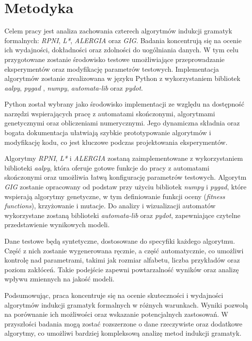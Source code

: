 \chapter{Metodyka}  
\label{cha:metodyka}  

Celem pracy jest analiza zachowania czterech algorytmów indukcji gramatyk formalnych: \textit{RPNI}, \textit{L*}, \textit{ALERGIA} oraz \textit{GIG}. Badania koncentrują się na ocenie ich wydajności, dokładności oraz zdolności do uogólniania danych. W tym celu przygotowane zostanie środowisko testowe umożliwiające przeprowadzanie eksperymentów oraz modyfikację parametrów testowych. Implementacja algorytmów zostanie zrealizowana w języku Python z wykorzystaniem bibliotek \textit{aalpy}, \textit{pygad} \cite{Gad2024}, \textit{numpy}, \textit{automata-lib} oraz \textit{pydot}.  

Python został wybrany jako środowisko implementacji ze względu na dostępność narzędzi wspierających pracę z automatami skończonymi, algorytmami genetycznymi oraz obliczeniami numerycznymi. Jego dynamiczna składnia oraz bogata dokumentacja ułatwiają szybkie prototypowanie algorytmów i modyfikację kodu, co jest kluczowe podczas projektowania eksperymentów.  

Algorytmy \textit{RPNI}, \textit{L*} i \textit{ALERGIA} zostaną zaimplementowane z wykorzystaniem biblioteki \textit{aalpy}, która oferuje gotowe funkcje do pracy z automatami skończonymi oraz umożliwia łatwą konfigurację parametrów testowych. Algorytm \textit{GIG} zostanie opracowany od podstaw przy użyciu bibliotek \textit{numpy} i \textit{pygad}, które wspierają algorytmy genetyczne, w tym definiowanie funkcji oceny (\textit{fitness functions}), krzyżowanie i mutacje. Do analizy i wizualizacji automatów wykorzystane zostaną biblioteki \textit{automata-lib} oraz \textit{pydot}, zapewniające czytelne przedstawienie wynikowych modeli.  

Dane testowe będą syntetyczne, dostosowane do specyfiki każdego algorytmu. Część z nich zostanie wygenerowana ręcznie, a część automatycznie, co umożliwi kontrolę nad parametrami, takimi jak rozmiar alfabetu, liczba przykładów oraz poziom zakłóceń. Takie podejście zapewni powtarzalność wyników oraz analizę wpływu zmiennych na jakość modeli.

Podsumowując, praca koncentruje się na ocenie skuteczności i wydajności algorytmów indukcji gramatyk formalnych w różnych warunkach. Wyniki pozwolą na porównanie ich możliwości oraz wskazanie potencjalnych zastosowań. W przyszłości badania mogą zostać rozszerzone o dane rzeczywiste oraz dodatkowe algorytmy, co umożliwi bardziej kompleksową analizę metod indukcji gramatyk.
